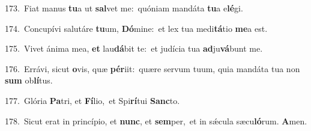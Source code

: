 {\numbfont\textcolor{\numbcolor}{173.}}~Fiat manus \textbf{tu}\-a ut \textbf{sal}\-vet me:~\star quóniam mandáta \textbf{tu}\-a e\-\textbf{lé}\-gi.\par
{\numbfont\textcolor{\numbcolor}{174.}}~Concupívi salutáre \textbf{tu}\-um, \textbf{Dó}\-mine:~\star et lex tua medi\-\textbf{tá}\-tio \textbf{me}\-a est.\par
{\numbfont\textcolor{\numbcolor}{175.}}~Vivet ánima mea, \textbf{et} lau\-\textbf{dá}\-bit te:~\star et judícia tua \textbf{ad}\-ju\-\textbf{vá}\-bunt me.\par
{\numbfont\textcolor{\numbcolor}{176.}}~Errávi, sicut \textbf{o}\-vis, quæ \textbf{pér}\-iit:~\star quære servum tuum, quia mandáta tua non \textbf{sum} ob\-\textbf{lí}\-tus.\par
{\numbfont\textcolor{\numbcolor}{177.}}~Glória \textbf{Pa}\-tri, et \textbf{Fí}\-lio,~\star et Spi\-\textbf{rí}\-tui \textbf{Sanc}\-to.\par
{\numbfont\textcolor{\numbcolor}{178.}}~Sicut erat in princípio, et \textbf{nunc}\-, et \textbf{sem}\-per,~\star et in sǽcula sæcu\-\textbf{ló}\-rum. \textbf{A}\-men.\par
